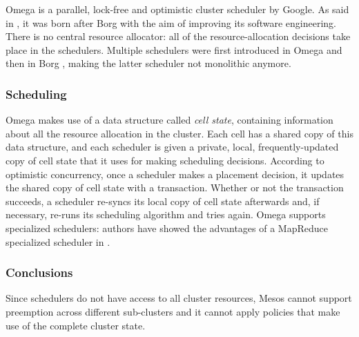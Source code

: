 Omega \cite{omega} is a parallel, lock-free and optimistic cluster scheduler by Google.
As said in \cite{borgomegakubernetes}, it was born after Borg \cite{borg} with the aim of improving its software engineering.
There is no central resource allocator: all of the resource-allocation decisions take place in the schedulers.
Multiple schedulers were first introduced in Omega \cite{omega} and then in Borg \cite{borg}, making the latter scheduler not monolithic anymore.

\subsubsection{Scheduling}
Omega \cite{omega} makes use of a data structure called \textit{cell state}, containing information about all the resource allocation in the cluster.
Each cell has a shared copy of this data structure, and each scheduler is given a private, local, frequently-updated copy of cell state that it uses for making scheduling decisions.
According to optimistic concurrency, once a scheduler makes a placement decision, it updates the shared copy of cell state with a transaction.
Whether or not the transaction succeeds, a scheduler re-syncs its local copy of cell state afterwards and, if necessary, re-runs its scheduling algorithm and tries again.
Omega \cite{omega} supports specialized schedulers: authors have showed the advantages of a MapReduce \cite{mapreduce} specialized scheduler in \cite{omega}.

\subsubsection{Conclusions}
Since schedulers do not have access to all cluster resources, Mesos \cite{mesos} cannot support preemption across different sub-clusters and it cannot apply policies that make use of the complete cluster state.


